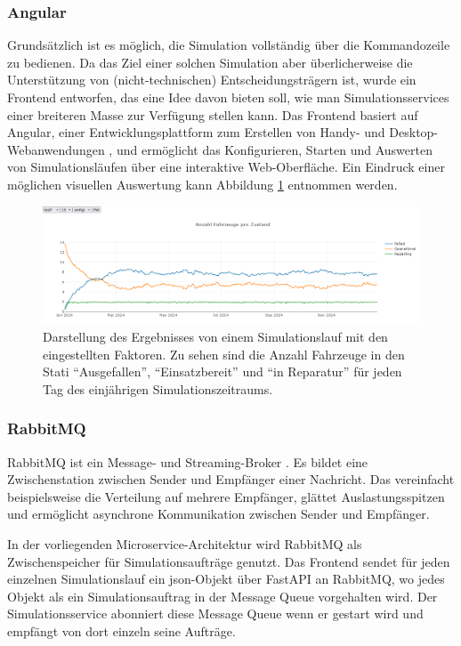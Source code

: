 \documentclass[11pt,a4paper]{article}
\begin{document}
\subsubsection{Angular}
\label{sec:Angular}
Grundsätzlich ist es möglich, die Simulation vollständig über die Kommandozeile zu bedienen.
Da das Ziel einer solchen Simulation aber überlicherweise die Unterstützung von (nicht-technischen) 
Entscheidungsträgern ist, wurde ein Frontend entworfen, das eine Idee davon bieten soll, wie man Simulationsservices
einer breiteren Masse zur Verfügung stellen kann. Das Frontend basiert auf Angular,
einer Entwicklungsplattform zum Erstellen von Handy- und Desktop-Webanwendungen \cite{jain2014angularjs},
und ermöglicht das Konfigurieren, Starten und Auswerten von Simulationsläufen über eine interaktive Web-Oberfläche.
Ein Eindruck einer möglichen visuellen Auswertung kann Abbildung \ref{fig:ergebnis-plot} entnommen werden.

\begin{figure}
	\label{fig:ergebnis-plot}
	\centering
	\includegraphics[width=\textwidth]{media/Ergebnisplot.png}
	\caption{
		Darstellung des Ergebnisses von einem Simulationslauf mit den eingestellten Faktoren.
		Zu sehen sind die Anzahl Fahrzeuge in den Stati ``Ausgefallen'', ``Einsatzbereit'' und ``in Reparatur''
		für jeden Tag des einjährigen Simulationszeitraums.
	}
\end{figure}

\subsubsection{RabbitMQ}
\label{sec:RabbitMQ}
RabbitMQ ist ein Message- und Streaming-Broker \cite{RabbitMQ}. Es bildet eine Zwischenstation
zwischen Sender und Empfänger einer Nachricht. Das vereinfacht beispielsweise die Verteilung auf 
mehrere Empfänger, glättet Auslastungsspitzen und ermöglicht asynchrone Kommunikation zwischen
Sender und Empfänger. 

In der vorliegenden Microservice-Architektur wird RabbitMQ als Zwischenspeicher für
Simulationsaufträge genutzt. Das Frontend sendet für jeden einzelnen Simulationslauf
ein json-Objekt über FastAPI an RabbitMQ, wo jedes Objekt als ein Simulationsauftrag
in der Message Queue vorgehalten wird. Der Simulationsservice abonniert diese Message Queue
wenn er gestart wird und empfängt von dort einzeln seine Aufträge.
\end{document}

